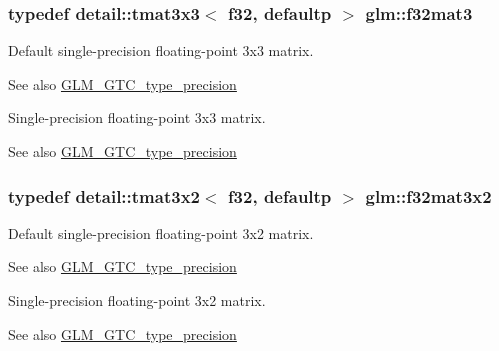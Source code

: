 \subsubsection[{\texorpdfstring{f32mat3}{f32mat3}}]{\setlength{\rightskip}{0pt plus 5cm}typedef detail\+::tmat3x3$<$ f32, defaultp $>$ {\bf glm\+::f32mat3}}\hypertarget{group__gtc__type__precision_gaf8d666dea6f652c21f0c1515ce522090}{}\label{group__gtc__type__precision_gaf8d666dea6f652c21f0c1515ce522090}
Default single-\/precision floating-\/point 3x3 matrix. \begin{DoxySeeAlso}{See also}
\hyperlink{group__gtc__type__precision}{G\+L\+M\+\_\+\+G\+T\+C\+\_\+type\+\_\+precision}
\end{DoxySeeAlso}
Single-\/precision floating-\/point 3x3 matrix. \begin{DoxySeeAlso}{See also}
\hyperlink{group__gtc__type__precision}{G\+L\+M\+\_\+\+G\+T\+C\+\_\+type\+\_\+precision} 
\end{DoxySeeAlso}
\subsubsection[{\texorpdfstring{f32mat3x2}{f32mat3x2}}]{\setlength{\rightskip}{0pt plus 5cm}typedef detail\+::tmat3x2$<$ f32, defaultp $>$ {\bf glm\+::f32mat3x2}}\hypertarget{group__gtc__type__precision_ga43fa9ba1875db74cba2cea33321a77ff}{}\label{group__gtc__type__precision_ga43fa9ba1875db74cba2cea33321a77ff}
Default single-\/precision floating-\/point 3x2 matrix. \begin{DoxySeeAlso}{See also}
\hyperlink{group__gtc__type__precision}{G\+L\+M\+\_\+\+G\+T\+C\+\_\+type\+\_\+precision}
\end{DoxySeeAlso}
Single-\/precision floating-\/point 3x2 matrix. \begin{DoxySeeAlso}{See also}
\hyperlink{group__gtc__type__precision}{G\+L\+M\+\_\+\+G\+T\+C\+\_\+type\+\_\+precision} 
\end{DoxySeeAlso}
